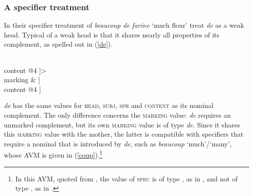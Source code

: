 \documentclass[output=paper
                ,modfonts
                ,nonflat
	        ,collection
	        ,collectionchapter
	        ,collectiontoclongg
 	        ,biblatex
                ,babelshorthands
                ,newtxmath
                ,draftmode
                ,colorlinks, citecolor=brown
]{./langsci/langscibook}
\begin{document}
\subsubsection{A specifier treatment} 


In their specifier treatment of \emph{beaucoup de farine} `much flour'  
\citet{Abeilleetal04} treat \emph{de} as a weak head. 
Typical of a weak head is that it shares 
nearly all properties of its complement, as spelled out in (\ref{de}).

\begin{exe} 
\ex\label{de} 
\begin{avm} 
[category [head & @1                                    \\
           subj & @A                                    \\
           spr  & @B                                     \\
           comps & <[category [head & @1                 \\
                               subj & @A                 \\
                               spr  & @B                 \\
                               comps & < >              \\
                               marking & \type{unmarked}] \\
                     content @4 ]>                       \\ 
           marking & ]                          \\
 content @4 ] 
\end{avm}
\end{exe} 

\noindent
\emph{de} has the same values for \textsc{head}, \textsc{subj}, \textsc{spr} and 
\textsc{content} as its nominal complement. 
The only difference concerns the \textsc{marking} value: \emph{de} requires an 
unmarked complement, but its own \textsc{marking} value is of type \emph{de}. 
Since it shares this \textsc{marking} value with the mother, the latter is 
compatible with specifiers that require a nominal that is introduced by \emph{de}, 
such as \emph{beaucoup} `much'/`many', whose AVM is given in 
(\ref{coup}).\footnote{In this AVM, quoted from \citet[18]{Abeilleetal04}, 
the value of \textsc{spec} is of type , as in \citet{ps2}, and not of type 
, as in \citet{GS00}.}  
\end{document}
